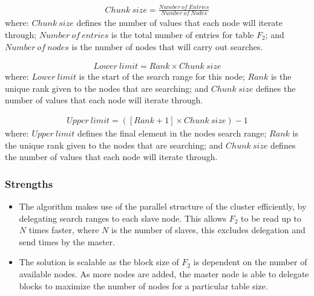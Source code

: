 \documentclass[10pt, conference]{IEEEtran}
\begin{document}
\begin{equation}
\label{eqn: MPI1}
\begin{split}
Chunk\ size = \frac{Number\ of\ Entries}{Number\ of\ Nodes}
\end{split}
\end{equation}
where: $Chunk\ size$ defines the number of values that each node will iterate through; $Number\ of\ entries$ is the total number of entries for table $F_2$; and $Number\ of\ nodes$ is the number of nodes that will carry out searches.

\begin{equation}
\label{eqn: MPI2}
\begin{split}
Lower\ limit = Rank \times Chunk\ size
\end{split}
\end{equation}
where: $Lower\ limit$ is the start of the search range for this node; $Rank$ is the unique rank given to the nodes that are searching; and $Chunk\ size$ defines the number of values that each node will iterate through.

\begin{equation}
\label{eqn: MPI3}
\begin{split}
Upper\ limit = \left([Rank+1]\times Chunk\ size\right)-1
\end{split}
\end{equation}
where: $Upper\ limit$ defines the final element in the nodes search range; $Rank$ is the unique rank given to the nodes that are searching; and $Chunk\ size$ defines the number of values that each node will iterate through.

\subsubsection{Strengths}
\label{sec: Strengths}
\begin{itemize}
\item The algorithm makes use of the parallel structure of the cluster efficiently, by delegating search ranges to each slave node. This allows $F_2$ to be read up to $N$ times faster, where $N$ is the number of slaves, this excludes delegation and send times by the master.
\item The solution is scalable as the block size of $F_2$ is dependent on the number of available nodes. As more nodes are added, the master node is able to delegate blocks to maximize the number of nodes for a particular table size.
\end{itemize}
\end{document}

